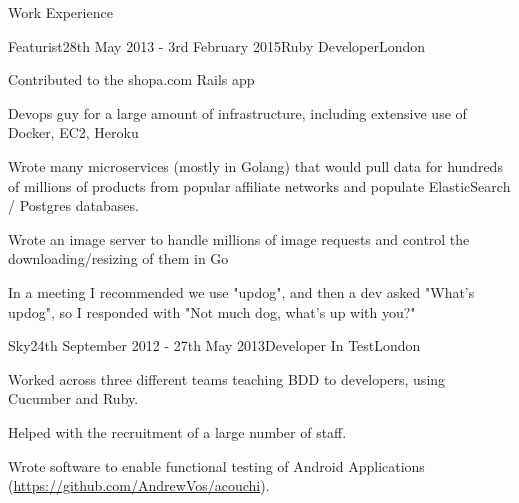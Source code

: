 \documentclass{resume}
\begin{document}
  \begin{rSection}{Work Experience}
    \begin{rSubsection}{Featurist}{28th May 2013 - 3rd February 2015}{Ruby Developer}{London}
    \item Contributed to the shopa.com Rails app
    \item Devops guy for a large amount of infrastructure, including extensive use of Docker, EC2, Heroku
    \item Wrote many microservices (mostly in Golang) that would pull data for hundreds of millions of products from popular affiliate networks and populate ElasticSearch / Postgres databases.
    \item Wrote an image server to handle millions of image requests and control the downloading/resizing of them in Go
    \item In a meeting I recommended we use "updog", and then a dev asked "What's updog", so I responded with "Not much dog, what's up with you?"
    \end{rSubsection}

    \begin{rSubsection}{Sky}{24th September 2012 - 27th May 2013}{Developer In Test}{London}
      \item Worked across three different teams teaching BDD to developers, using Cucumber and Ruby.
      \item Helped with the recruitment of a large number of staff.
      \item Wrote software to enable functional testing of Android Applications (\url{https://github.com/AndrewVos/acouchi}).
    \end{rSubsection}


\end{rSection}
\end{document}
